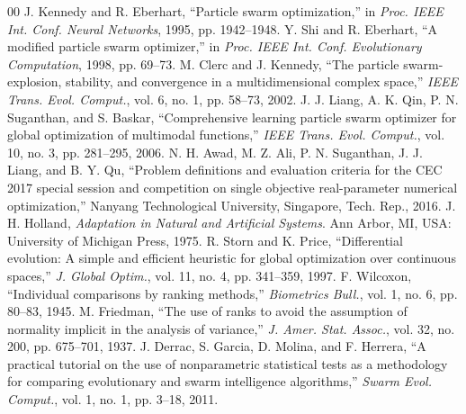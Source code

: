 \documentclass[conference]{IEEEtran}
\begin{document}
\begin{thebibliography}{00}
 J. Kennedy and R. Eberhart, ``Particle swarm optimization,'' in \textit{Proc. IEEE Int. Conf. Neural Networks}, 1995, pp. 1942--1948.
 Y. Shi and R. Eberhart, ``A modified particle swarm optimizer,'' in \textit{Proc. IEEE Int. Conf. Evolutionary Computation}, 1998, pp. 69--73.
 M. Clerc and J. Kennedy, ``The particle swarm-explosion, stability, and convergence in a multidimensional complex space,'' \textit{IEEE Trans. Evol. Comput.}, vol. 6, no. 1, pp. 58--73, 2002.
 J. J. Liang, A. K. Qin, P. N. Suganthan, and S. Baskar, ``Comprehensive learning particle swarm optimizer for global optimization of multimodal functions,'' \textit{IEEE Trans. Evol. Comput.}, vol. 10, no. 3, pp. 281--295, 2006.
 N. H. Awad, M. Z. Ali, P. N. Suganthan, J. J. Liang, and B. Y. Qu, ``Problem definitions and evaluation criteria for the CEC 2017 special session and competition on single objective real-parameter numerical optimization,'' Nanyang Technological University, Singapore, Tech. Rep., 2016.
 J. H. Holland, \textit{Adaptation in Natural and Artificial Systems}. Ann Arbor, MI, USA: University of Michigan Press, 1975.
 R. Storn and K. Price, ``Differential evolution: A simple and efficient heuristic for global optimization over continuous spaces,'' \textit{J. Global Optim.}, vol. 11, no. 4, pp. 341--359, 1997.
 F. Wilcoxon, ``Individual comparisons by ranking methods,'' \textit{Biometrics Bull.}, vol. 1, no. 6, pp. 80--83, 1945.
 M. Friedman, ``The use of ranks to avoid the assumption of normality implicit in the analysis of variance,'' \textit{J. Amer. Stat. Assoc.}, vol. 32, no. 200, pp. 675--701, 1937.
 J. Derrac, S. Garcia, D. Molina, and F. Herrera, ``A practical tutorial on the use of nonparametric statistical tests as a methodology for comparing evolutionary and swarm intelligence algorithms,'' \textit{Swarm Evol. Comput.}, vol. 1, no. 1, pp. 3--18, 2011.
\end{thebibliography}
\end{document}
